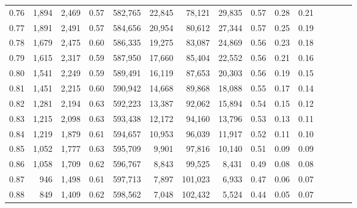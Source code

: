 \begin{tabular}{rrrcrrrrrrrrrrr}
0.76 &   1,894 &  2,469 &                                       0.57 &  582,765 &   22,845 &   78,121 &   29,835 &  0.57 &  0.28 &                         0.21 \\
0.77 &   1,891 &  2,491 &                                       0.57 &  584,656 &   20,954 &   80,612 &   27,344 &  0.57 &  0.25 &                         0.19 \\
0.78 &   1,679 &  2,475 &                                       0.60 &  586,335 &   19,275 &   83,087 &   24,869 &  0.56 &  0.23 &                         0.18 \\
0.79 &   1,615 &  2,317 &                                       0.59 &  587,950 &   17,660 &   85,404 &   22,552 &  0.56 &  0.21 &                         0.16 \\
0.80 &   1,541 &  2,249 &                                       0.59 &  589,491 &   16,119 &   87,653 &   20,303 &  0.56 &  0.19 &                         0.15 \\
0.81 &   1,451 &  2,215 &                                       0.60 &  590,942 &   14,668 &   89,868 &   18,088 &  0.55 &  0.17 &                         0.14 \\
0.82 &   1,281 &  2,194 &                                       0.63 &  592,223 &   13,387 &   92,062 &   15,894 &  0.54 &  0.15 &                         0.12 \\
0.83 &   1,215 &  2,098 &                                       0.63 &  593,438 &   12,172 &   94,160 &   13,796 &  0.53 &  0.13 &                         0.11 \\
0.84 &   1,219 &  1,879 &                                       0.61 &  594,657 &   10,953 &   96,039 &   11,917 &  0.52 &  0.11 &                         0.10 \\
0.85 &   1,052 &  1,777 &                                       0.63 &  595,709 &    9,901 &   97,816 &   10,140 &  0.51 &  0.09 &                         0.09 \\
0.86 &   1,058 &  1,709 &                                       0.62 &  596,767 &    8,843 &   99,525 &    8,431 &  0.49 &  0.08 &                         0.08 \\
0.87 &     946 &  1,498 &                                       0.61 &  597,713 &    7,897 &  101,023 &    6,933 &  0.47 &  0.06 &                         0.07 \\
0.88 &     849 &  1,409 &                                       0.62 &  598,562 &    7,048 &  102,432 &    5,524 &  0.44 &  0.05 &                         0.07 \\

\end{tabular}
